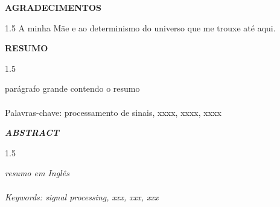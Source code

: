 \documentclass[a4paper,12pt,openright,oneside]{book}
\newenvironment{myenv}[1]
  {\begin{spacing}{#1}}
  {\end{spacing}}
\begin{document}
\newpage \thispagestyle{empty}
\vspace{1.5cm}
\fontsize{12}{\baselineskip} \selectfont
\begin{center}
{\huge{\textbf{AGRADECIMENTOS}}}
\end{center}
\begin{myenv}{1.5}
\vspace{1.5pt}
\vspace{1.5pt}
A minha Mãe e ao determinismo do universo que me trouxe até aqui.
\end{myenv}
\setlength{\parindent}{0pt}
\newpage \thispagestyle{empty}
\vspace{1.5cm}
\fontsize{12}{\baselineskip} \selectfont
\begin{center}
{\huge{\textbf{RESUMO}}}
\end{center}
\begin{myenv}{1.5}
\fontsize{12}{\baselineskip} \selectfont \onehalfspacing
\par \null
\par {} par\'{a}grafo grande contendo o resumo
\\
\\
Palavras-chave: processamento de sinais, xxxx, xxxx, xxxx
\end{myenv}
\setlength{\parindent}{0pt}
\newpage \thispagestyle{empty}
\vspace{1.5cm}
\fontsize{12}{\baselineskip} \selectfont
\begin{center}
{\huge{\textit{ \textbf{ABSTRACT}}}}
\end{center}
\begin{myenv}{1.5}
\fontsize{12}{\baselineskip} \selectfont \onehalfspacing
\par \null
\par \null
\textit{resumo em Ingl\^{e}s}\\
\\
\textit{Keywords: signal processing, xxx, xxx, xxx}
\end{myenv}
\cleardoublepage
{}
\listoffigures
\cleardoublepage
{}
\listoftables
\frontmatter
\def\contentsname{Sum{\'a}rio} 
\tableofcontents
\cleardoublepage
\mainmatter
\setlength{\parindent}{1.25cm}
\end{document}
